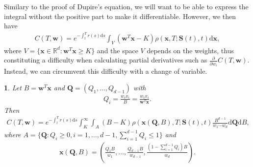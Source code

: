 \documentclass[english]{article}
\numberwithin{equation}{section}
\numberwithin{figure}{section}
\theoremstyle{bolddescit}
\theoremstyle{definition}
\theoremstyle{definition}
\theoremstyle{plain}
\newtheorem{lemma}[theorem]{\protect\lemmaname}
\theoremstyle{plain}
\theoremstyle{bolddesc}
\theoremstyle{plain}
\theoremstyle{remark}
\providecommand{\lemmaname}{Lemma}
\begin{document}
Similary to the proof of Dupire's equation, we will want to be able to express the integral without the positive part to make it differentiable. However, we then have
\begin{align}\label{eq:generalisation-int-over-V}
  C(T,\mathbf{w}) = e^{-\int_t^T r(s) \mathrm{d}s} \int_V (\mathbf{w}^T\mathbf{x} - K) \rho(\mathbf{x},T;\mathbf{S}(t),t) \mathrm{d}\mathbf{x},
\end{align}
where $V = \{ \mathbf{x} \in \mathbb{R}^d : \mathbf{w}^T \mathbf{x} \ge K \}$ and the space $V$ depends on the weights, thus constituting a difficulty when calculating partial derivatives such as $\frac{\partial}{\partial w_i}C(T,\mathbf{w})$. Instead, we can circumvent this difficulty with a change of variable.

\begin{lemma}\label{lem:generalisation-var-change}
  Let $B = \mathbf{w}^T \mathbf{x}$ and $\mathbf{Q} = (Q_1,\ldots,Q_{d-1})$ with
  \begin{align}\label{eq:generalisation-var-change-Q}
    Q_i = \frac{w_i x_i}{B} = \frac{w_i x_i}{\mathbf{w}^T \mathbf{x}}.
  \end{align}
  Then
  \begin{align*}
    C(T,\mathbf{w}) = e^{-\int_t^T r(s) \mathrm{d}s} \int_K^\infty \int_A \left(B - K\right) \rho(\mathbf{x}(\mathbf{Q},B),T;\mathbf{S}(t),t) \frac{B^{d-1}}{w_1 \cdots w_d} \mathrm{d}\mathbf{Q} \mathrm{d}B,
  \end{align*}
  where $A = \{\mathbf{Q} : Q_i \ge 0, i=1,\ldots,d-1, \sum_{i=1}^{d-1} Q_i \le 1\}$ and
  \begin{align*}
    \mathbf{x}(\mathbf{Q},B) = \left(\frac{Q_1 B}{w_1},\dots, \frac{Q_{d-1} B}{w_{d-1}}, \frac{(1 - \sum_{i=1}^{d-1} Q_i) B}{w_{d}}\right).
  \end{align*}


\end{lemma}
\end{document}
